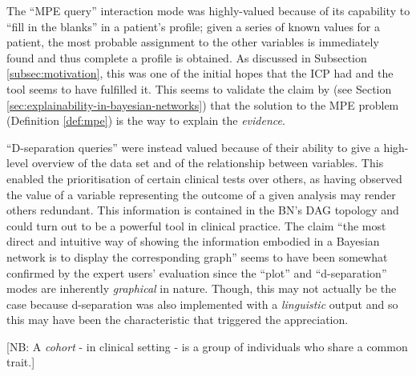 The \enquote{MPE query} interaction mode was highly-valued because of its capability to \enquote{fill in the blanks} in a patient's profile; given a series of known values for a patient, the most probable assignment to the other variables is immediately found and thus complete a profile is obtained.
As discussed in Subsection \ref{subsec:motivation}, this was one of the initial hopes that the ICP had and the tool seems to have fulfilled it.
This seems to validate the claim by \citet{lacave2002review} (see Section \ref{sec:explainability-in-bayesian-networks}) that the solution to the MPE problem (Definition \ref{def:mpe}) is the way to explain the \textit{evidence}.

\enquote{D-separation queries} were instead valued because of their ability to give a high-level overview of the data set and of the relationship between variables.
This enabled the prioritisation of certain clinical tests over others, as having observed the value of a variable representing the outcome of a given analysis may render others redundant.
This information is contained in the BN's DAG topology and could turn out to be a powerful tool in clinical practice.
The claim \enquote{the most direct and intuitive way of showing the information embodied in a Bayesian network is to display the corresponding graph} \citep{lacave2002review} seems to have been somewhat confirmed by the expert users' evaluation since the \enquote{plot} and \enquote{d-separation} modes are inherently \textit{graphical} in nature.
Though, this may not actually be the case because d-separation was also implemented with a \textit{linguistic} output and so this may have been the characteristic that triggered the appreciation.

[NB: A \textit{cohort} - in clinical setting - is a group of individuals who share a common trait.]

